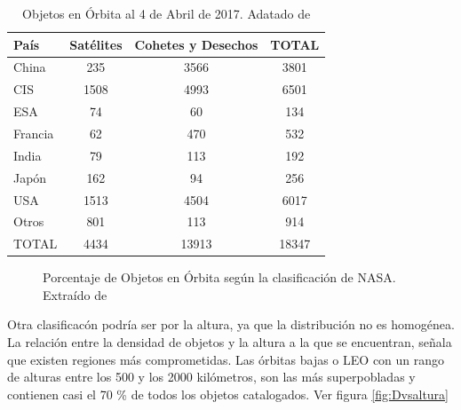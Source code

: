 \begin{table}
 \centering
 \begin{tabular}{|l|c|c|c|}
  \hline \hline
  \rowcolor{lightgray}
  \bf{Pa\'is}  &    \bf{Sat\'elites} & \bf{Cohetes y Desechos} & TOTAL\\
  \hline \hline
  China & 235 & 3566&3801\\
  \hline
  CIS & 1508&4993&6501\\
  \hline
  ESA &74&60&134\\
  \hline
  Francia & 62&470&532\\
  \hline
  India & 79 & 113 & 192\\
  \hline
  Jap\'on & 162 & 94 & 256\\
  \hline
  USA & 1513 & 4504 & 6017\\
  \hline
  Otros & 801 & 113 & 914 \\
  \hline\hline
  \rowcolor{lightgray}
  TOTAL & 4434 & 13913 & 18347 \\
  \hline\hline
 \end{tabular}
 \caption[Objetos en \'Orbita al 4 de Abril de 2017.]{Objetos en \'Orbita al 4 de Abril de 2017. Adatado de \cite{ODQN}}
\end{table}

\begin{figure}[!h]
\centering
    \caption[Objetos en \'Orbita seg\'un NASA.]{Porcentaje de Objetos en \'Orbita seg\'un la clasificaci\'on de NASA. Extra\'ido de \cite{ODQN}}
    \label{fig:catxtipo}
\end{figure}

Otra clasificac\'on podr\'ia ser por la altura, ya que la distribuci\'on no es homog\'enea. La relaci\'on entre la densidad de objetos y la altura a la que se encuentran, señala que existen regiones m\'as comprometidas.
Las \'orbitas bajas o \ac{LEO} con un rango de alturas entre los 500 y los 2000 kil\'ometros, son las m\'as superpobladas y contienen casi el 70 \% de todos los objetos catalogados. Ver figura \ref{fig:Dvsaltura}

